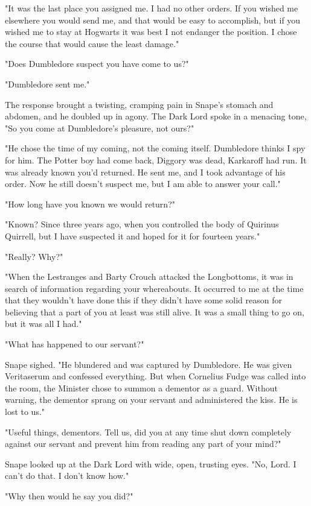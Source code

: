 "It was the last place you assigned me. I had no other orders. If you wished me elsewhere you would send me, and that would be easy to accomplish, but if you wished me to stay at Hogwarts it was best I not endanger the position. I chose the course that would cause the least damage."

"Does Dumbledore suspect you have come to us?"

"Dumbledore sent me."

The response brought a twisting, cramping pain in Snape's stomach and abdomen, and he doubled up in agony. The Dark Lord spoke in a menacing tone, "So you come at Dumbledore's pleasure, not ours?"

"He chose the time of my coming, not the coming itself. Dumbledore thinks I spy for him. The Potter boy had come back, Diggory was dead, Karkaroff had run. It was already known you'd returned. He sent me, and I took advantage of his order. Now he still doesn't suspect me, but I am able to answer your call."

"How long have you known we would return?"

"Known? Since three years ago, when you controlled the body of Quirinus Quirrell, but I have suspected it and hoped for it for fourteen years."

"Really? Why?"

"When the Lestranges and Barty Crouch attacked the Longbottoms, it was in search of information regarding your whereabouts. It occurred to me at the time that they wouldn't have done this if they didn't have some solid reason for believing that a part of you at least was still alive. It was a small thing to go on, but it was all I had."

"What has happened to our servant?"

Snape sighed. "He blundered and was captured by Dumbledore. He was given Veritaserum and confessed everything. But when Cornelius Fudge was called into the room, the Minister chose to summon a dementor as a guard. Without warning, the dementor sprang on your servant and administered the kiss. He is lost to us."

"Useful things, dementors. Tell us, did you at any time shut down completely against our servant and prevent him from reading any part of your mind?"

Snape looked up at the Dark Lord with wide, open, trusting eyes. "No, Lord. I can't do that. I don't know how."

"Why then would he say you did?"


